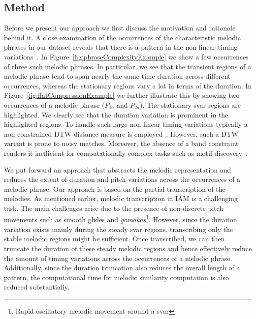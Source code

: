 \subsection{Method}
\label{sec:patterns_improving_similarity_method}

Before we present our approach we first discuss the motivation and rationale behind it. A close examination of the occurrences of the characteristic melodic phrases in our dataset reveals that there is a pattern in the non-linear timing variations~\cite{Rao2014}. In Figure~\ref{fig:phraseComplexityExample} we show a few occurrences of three such melodic phrases. In particular, we see that the transient regions of a melodic phrase tend to span nearly the same time duration across different occurrences, whereas the stationary regions vary a lot in terms of the duration. In Figure~\ref{fig:flatCompressionExample} we further illustrate this by showing two occurrences of a melodic phrase ($P_{1a}$ and $P_{2a}$). The stationary svar regions are highlighted. We clearly see that the duration variation is prominent in the highlighted regions. To handle such large non-linear timing variations typically a non-constrained DTW distance measure is employed~\cite{gulati_ICASSP2015}. However, such a DTW variant is prone to noisy matches. Moreover, the absence of a band constraint renders it inefficient for computationally complex tasks such as motif discovery~\cite{gulati_SITIS_2014}.

We put forward an approach that abstracts the melodic representation and reduces the extent of duration and pitch variations across the occurrences of a melodic phrase. Our approach is based on the partial transcription of the melodies.  As mentioned earlier, melodic transcription in IAM is a challenging task. The main challenges arise due to the presence of non-discrete pitch movements such as smooth glides and {\it gamakas}\footnote{Rapid oscillatory melodic movement around a svar}.  However, since the duration variation exists mainly during the steady svar regions, transcribing only the stable melodic regions might be sufficient. Once transcribed, we can then truncate the duration of these steady melodic regions and hence effectively reduce the amount of timing variations across the occurrences of a melodic phrase. Additionally, since the duration truncation also reduces the overall length of a pattern, the computational time for melodic similarity computation is also reduced substantially. %


